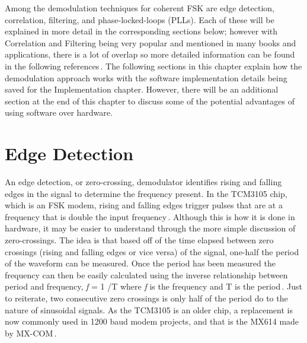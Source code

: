 Among the demodulation techniques for coherent FSK are edge detection, correlation, filtering, and phase-locked-loops (PLLs). Each of these will be explained in more detail in the corresponding sections below; however with Correlation and Filtering being very popular and mentioned in many books and applications, there is a lot of overlap so more detailed information can be found in the following references\,\cite{MarvinK.Simon1995,Sklar1988,J.Das1986,Proakis1983,Seguine2006,Semiconductor}. The following sections in this chapter explain how the demodulation approach works with the software implementation details being saved for the Implementation chapter. However, there will be an additional section at the end of this chapter to discuss some of the potential advantages of using software over hardware.

\section{Edge Detection}
An edge detection, or zero-crossing, demodulator identifies rising and falling edges in the signal to determine the frequency present. In the TCM3105 chip, which is an FSK modem, rising and falling edges trigger pulses that are at a frequency that is double the input frequency\,\cite{Instruments1994}. Although this is how it is done in hardware, it may be easier to understand through the more simple discussion of zero-crossings. The idea is that based off of the time elapsed between zero crossings (rising and falling edges or vice versa) of the signal, one-half the period of the waveform can be measured. Once the period has been measured the frequency can then be easily calculated using the inverse relationship between period and frequency, \textit{f} = 1 /T where \textit{f} is the frequency and T is the period\,\cite{Seguine2006}. Just to reiterate, two consecutive zero crossings is only half of the period do to the nature of sinusoidal signals. As the TCM3105 is an older chip, a replacement is now commonly used in 1200 baud modem projects, and that is the MX614 made by MX-COM\,\cite{Mitrenga2000}.

